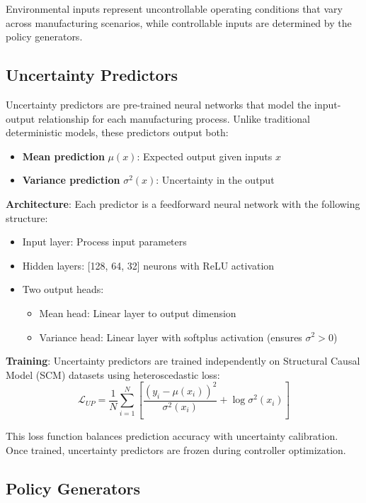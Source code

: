 \documentclass[11pt,a4paper]{article}
\begin{document}
Environmental inputs represent uncontrollable operating conditions that vary across manufacturing scenarios, while controllable inputs are determined by the policy generators.

\subsection{Uncertainty Predictors}

Uncertainty predictors are pre-trained neural networks that model the input-output relationship for each manufacturing process. Unlike traditional deterministic models, these predictors output both:

\begin{itemize}
    \item \textbf{Mean prediction} $\mu(x)$: Expected output given inputs $x$
    \item \textbf{Variance prediction} $\sigma^2(x)$: Uncertainty in the output
\end{itemize}

\textbf{Architecture}: Each predictor is a feedforward neural network with the following structure:
\begin{itemize}
    \item Input layer: Process input parameters
    \item Hidden layers: [128, 64, 32] neurons with ReLU activation
    \item Two output heads:
    \begin{itemize}
        \item Mean head: Linear layer to output dimension
        \item Variance head: Linear layer with softplus activation (ensures $\sigma^2 > 0$)
    \end{itemize}
\end{itemize}

\textbf{Training}: Uncertainty predictors are trained independently on Structural Causal Model (SCM) datasets using heteroscedastic loss:
$$
\mathcal{L}_{UP} = \frac{1}{N} \sum_{i=1}^{N} \left[ \frac{(y_i - \mu(x_i))^2}{\sigma^2(x_i)} + \log \sigma^2(x_i) \right]
$$

This loss function balances prediction accuracy with uncertainty calibration. Once trained, uncertainty predictors are frozen during controller optimization.

\subsection{Policy Generators}
\end{document}
